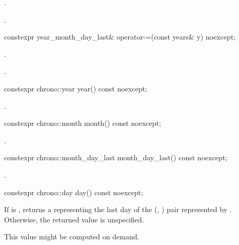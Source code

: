 \begin{itemdescr}
\pnum
\effects
{}.

\pnum
\returns
{}.
\end{itemdescr}

%
\begin{itemdecl}
constexpr year_month_day_last& operator-=(const years& y) noexcept;
\end{itemdecl}

\begin{itemdescr}
\pnum
\effects
{}.

\pnum
\returns
{}.
\end{itemdescr}

%
\begin{itemdecl}
constexpr chrono::year year() const noexcept;
\end{itemdecl}

\begin{itemdescr}
\pnum
\returns
{}.
\end{itemdescr}

%
\begin{itemdecl}
constexpr chrono::month month() const noexcept;
\end{itemdecl}

\begin{itemdescr}
\pnum
\returns
{}.
\end{itemdescr}

%
\begin{itemdecl}
constexpr chrono::month_day_last month_day_last() const noexcept;
\end{itemdecl}

\begin{itemdescr}
\pnum
\returns
{}.
\end{itemdescr}

%
\begin{itemdecl}
constexpr chrono::day day() const noexcept;
\end{itemdecl}

\begin{itemdescr}
\pnum
\returns
If  is ,
returns a  representing
the last day of the (, ) pair
represented by .
Otherwise, the returned value is unspecified.

\pnum
\begin{note}
This value might be computed on demand.
\end{note}
\end{itemdescr}


